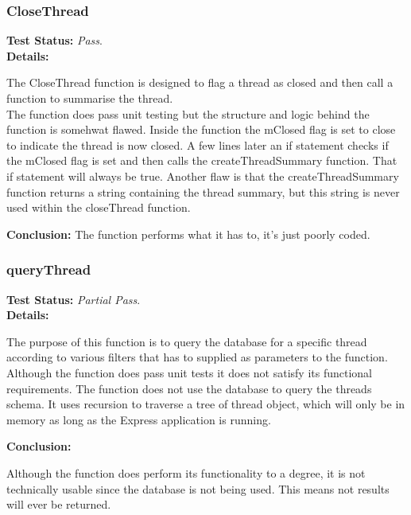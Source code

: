 \subsubsection{CloseThread}
\begin{flushleft}
\textbf{Test Status:} \emph{Pass}. \\

\textbf{Details:}

The CloseThread function is designed to flag a thread as closed and then call a function to summarise the thread.\\

The function does pass unit testing but the structure and logic behind the function is somehwat flawed. Inside the function the mClosed flag is set to close to indicate the thread is now closed. A few lines later an if statement checks if the mClosed flag is set and then calls the createThreadSummary function. That if statement will always be true. Another flaw is that the createThreadSummary function returns a string containing the thread summary, but this string is never used within the closeThread function. 

\textbf{Conclusion:}
The function performs what it has to, it's just poorly coded. 

\end{flushleft}
\subsubsection{queryThread}
\begin{flushleft}
\textbf{Test Status:} \emph{Partial Pass}. \\

\textbf{Details:}

The purpose of this function is to query the database for a specific thread according to various filters that has to supplied as parameters to the function. Although the function does pass unit tests it does not satisfy its functional requirements. The function does not use the database to query the threads schema. It uses recursion to traverse a tree of thread object, which will only be in memory as long as the Express application is running. 

\textbf{Conclusion:}

Although the function does perform its functionality to a degree, it is not technically usable since the database is not being used. This means not results will ever be returned.



\end{flushleft}
